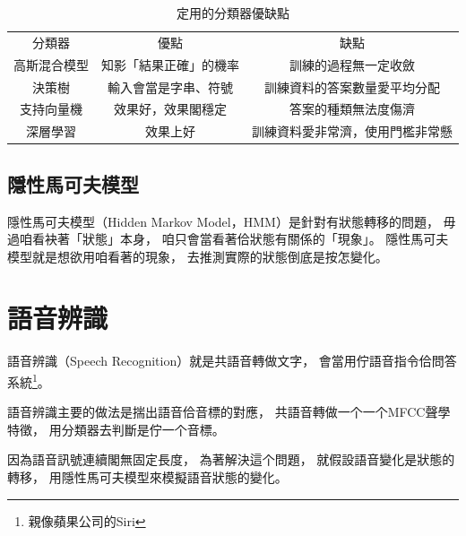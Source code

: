 \begin{table}
\caption{定用的分類器優缺點}
\label{表：定用的分類器優缺點}
\centering
\begin{tabular}{ccc}
分類器 & 優點 & 缺點 \\
高斯混合模型 & 知影「結果正確」的機率 & 訓練的過程無一定收斂 \\
決策樹 & 輸入會當是字串、符號 & 訓練資料的答案數量愛平均分配\\
支持向量機 & 效果好，效果閣穩定 & 答案的種類無法度傷濟\\
深層學習 & 效果上好 & 訓練資料愛非常濟，使用門檻非常懸\\
\end{tabular}
\end{table}
%
%

\subsection{隱性馬可夫模型}
\label{小節：隱性馬可夫模型}
隱性馬可夫模型（Hidden Markov Model，HMM）\cite{隱馬爾可夫模型}是針對有狀態轉移的問題，
毋過咱看袂著「狀態」本身，
咱只會當看著佮狀態有關係的「現象」。
隱性馬可夫模型就是想欲用咱看著的現象，
去推測實際的狀態倒底是按怎變化。



\section{語音辨識}
\label{節：語音辨識}
語音辨識（Speech Recognition）就是共語音轉做文字，
會當用佇語音指令佮問答系統\footnote{親像蘋果公司的Siri}。

語音辨識主要的做法是揣出語音佮音標的對應，
共語音轉做一个一个MFCC聲學特徵，
用分類器去判斷是佇一个音標。

因為語音訊號連續閣無固定長度，
為著解決這个問題，
就假設語音變化是狀態的轉移，
用隱性馬可夫模型來模擬語音狀態的變化。

